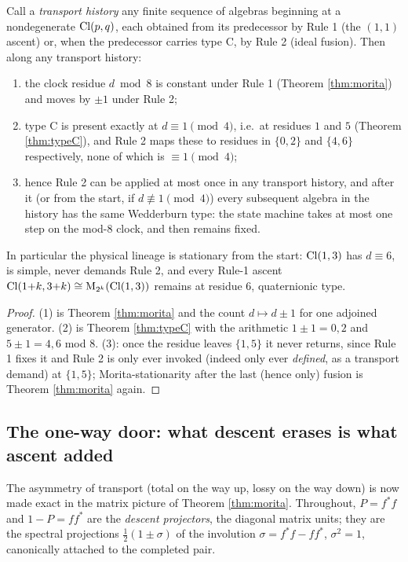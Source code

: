 \begin{proposition}\label{prop:parks}
Call a \emph{transport history} any finite sequence of algebras beginning at a nondegenerate $\mathrm{Cl}(p,q)$, each obtained from its predecessor by Rule 1 (the $(1,1)$ ascent) or, when the predecessor carries type C, by Rule 2 (ideal fusion). Then along any transport history:
\begin{enumerate}
\item the clock residue $d \bmod 8$ is constant under Rule 1 (Theorem \ref{thm:morita}) and moves by $\pm 1$ under Rule 2;
\item type C is present exactly at $d \equiv 1 \pmod 4$, i.e.\ at residues $1$ and $5$ (Theorem \ref{thm:typeC}), and Rule 2 maps these to residues in $\{0, 2\}$ and $\{4, 6\}$ respectively, none of which is $\equiv 1 \pmod 4$;
\item hence Rule 2 can be applied at most once in any transport history, and after it (or from the start, if $d \not\equiv 1 \pmod 4$) every subsequent algebra in the history has the same Wedderburn type: the state machine takes at most one step on the mod-8 clock, and then remains fixed.
\end{enumerate}
In particular the physical lineage is stationary from the start: $\mathrm{Cl}(1,3)$ has $d \equiv 6$, is simple, never demands Rule 2, and every Rule-1 ascent $\mathrm{Cl}(1{+}k, 3{+}k) \cong \mathrm{M}_{2^k}(\mathrm{Cl}(1,3))$ remains at residue $6$, quaternionic type.
\end{proposition}

\begin{proof}
(1) is Theorem \ref{thm:morita} and the count $d \mapsto d \pm 1$ for one adjoined generator. (2) is Theorem \ref{thm:typeC} with the arithmetic $1 \pm 1 = 0, 2$ and $5 \pm 1 = 4, 6$ mod $8$. (3): once the residue leaves $\{1, 5\}$ it never returns, since Rule 1 fixes it and Rule 2 is only ever invoked (indeed only ever \emph{defined}, as a transport demand) at $\{1,5\}$; Morita-stationarity after the last (hence only) fusion is Theorem \ref{thm:morita} again.
\end{proof}

\subsection{The one-way door: what descent erases is what ascent added}\label{subsec:oneway}

The asymmetry of transport (total on the way up, lossy on the way down) is now made exact in the matrix picture of Theorem \ref{thm:morita}. Throughout, $P = f^*f$ and $1 - P = ff^*$ are the \emph{descent projectors}, the diagonal matrix units; they are the spectral projections $\tfrac12(1 \pm \sigma)$ of the involution $\sigma = f^*f - ff^*$, $\sigma^2 = 1$, canonically attached to the completed pair.

